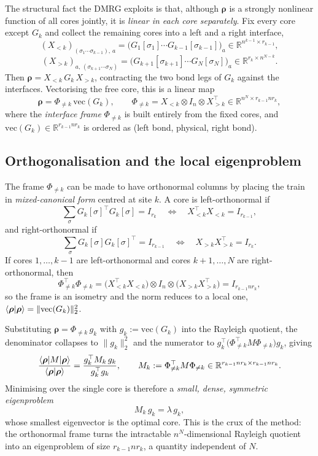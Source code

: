 \documentclass[12pt]{article}
\newcommand{\R}{\mathbb{R}}
\newcommand{\brho}{\boldsymbol{\rho}}
\theoremstyle{definition}
\theoremstyle{remark}
\begin{document}
The structural fact the DMRG exploits is that, although $\brho$ is a strongly nonlinear function of all cores jointly, it is \emph{linear in each core separately}. Fix every core except $G_k$ and collect the remaining cores into a left and a right interface,
\[
(X_{<k})_{(\sigma_1 \cdots \sigma_{k-1}),\, a}
  = \big(G_1[\sigma_1] \cdots G_{k-1}[\sigma_{k-1}]\big)_a
  \in \R^{n^{k-1} \times r_{k-1}},
\]
\[
(X_{>k})_{a,\, (\sigma_{k+1} \cdots \sigma_N)}
  = \big(G_{k+1}[\sigma_{k+1}] \cdots G_N[\sigma_N]\big)_a
  \in \R^{r_k \times n^{N-k}}.
\]
Then $\brho = X_{<k}\, G_k\, X_{>k}$, contracting the two bond legs of $G_k$ against the interfaces. Vectorising the free core, this is a linear map
\[
\brho = \Phi_{\neq k}\, \mathrm{vec}(G_k),
\qquad
\Phi_{\neq k} = X_{<k} \otimes I_n \otimes X_{>k}^\top
\in \R^{n^N \times r_{k-1} n r_k},
\]
where the \emph{interface frame} $\Phi_{\neq k}$ is built entirely from the fixed cores, and $\mathrm{vec}(G_k) \in \R^{r_{k-1} n r_k}$ is ordered as (left bond, physical, right bond).

\subsection{Orthogonalisation and the local eigenproblem}\label{sec:local-eig}

The frame $\Phi_{\neq k}$ can be made to have orthonormal columns by placing the train in \emph{mixed-canonical form} centred at site $k$. A core is left-orthonormal if
\[
\sum_{\sigma} G_k[\sigma]^\top G_k[\sigma] = I_{r_k}
\quad \Longleftrightarrow \quad
X_{<k}^\top X_{<k} = I_{r_{k-1}},
\]
and right-orthonormal if
\[
\sum_{\sigma} G_k[\sigma] G_k[\sigma]^\top = I_{r_{k-1}}
\quad \Longleftrightarrow \quad
X_{>k} X_{>k}^\top = I_{r_k}.
\]
If cores $1, \dots, k-1$ are left-orthonormal and cores $k+1, \dots, N$ are right-orthonormal, then
\[
\Phi_{\neq k}^\top \Phi_{\neq k}
= \big(X_{<k}^\top X_{<k}\big) \otimes I_n \otimes \big(X_{>k} X_{>k}^\top\big)
= I_{r_{k-1} n r_k},
\]
so the frame is an isometry and the norm reduces to a local one, $\braket{\brho | \brho} = \|\mathrm{vec}(G_k)\|_2^2$.

Substituting $\brho = \Phi_{\neq k}\, g_k$ with $g_k := \mathrm{vec}(G_k)$ into the Rayleigh quotient, the denominator collapses to $\|g_k\|_2^2$ and the numerator to $g_k^\top \big(\Phi_{\neq k}^\top M \Phi_{\neq k}\big) g_k$, giving
\[
\frac{\braket{\brho | M | \brho}}{\braket{\brho | \brho}}
= \frac{g_k^\top M_k\, g_k}{g_k^\top g_k},
\qquad
M_k := \Phi_{\neq k}^\top M \Phi_{\neq k}
\in \R^{r_{k-1} n r_k \times r_{k-1} n r_k}.
\]
Minimising over the single core is therefore a \emph{small, dense, symmetric eigenproblem}
\[
M_k\, g_k = \lambda\, g_k,
\]
whose smallest eigenvector is the optimal core. This is the crux of the method: the orthonormal frame turns the intractable $n^N$-dimensional Rayleigh quotient into an eigenproblem of size $r_{k-1} n r_k$, a quantity independent of $N$.
\end{document}
